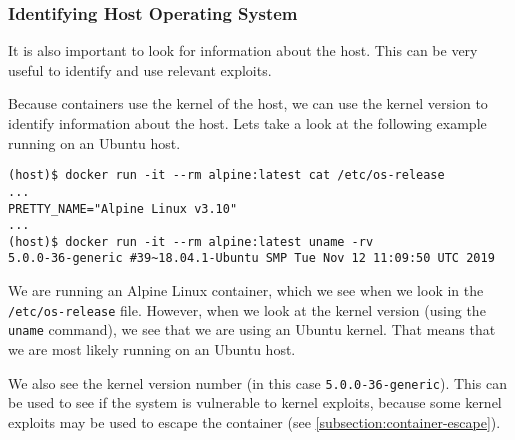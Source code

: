 \subsubsection{Identifying Host Operating System}
It is also important to look for information about the host. This can be very useful to identify and use relevant exploits.

\hfill

Because containers use the kernel of the host, we can use the kernel version to identify information about the host. Lets take a look at the following example running on an Ubuntu host.
\begin{lstlisting}[caption={\lstinline{/etc/os-release} and \lstinline{uname} differ},captionpos=b]
(host)$ docker run -it --rm alpine:latest cat /etc/os-release
...
PRETTY_NAME="Alpine Linux v3.10"
...
(host)$ docker run -it --rm alpine:latest uname -rv
5.0.0-36-generic #39~18.04.1-Ubuntu SMP Tue Nov 12 11:09:50 UTC 2019
\end{lstlisting}

We are running an Alpine Linux container, which we see when we look in the \lstinline{/etc/os-release} file. However, when we look at the kernel version (using the \lstinline{uname} command), we see that we are using an Ubuntu kernel. That means that we are most likely running on an Ubuntu host.

\hfill

We also see the kernel version number (in this case \lstinline{5.0.0-36-generic}). This can be used to see if the system is vulnerable to kernel exploits, because some kernel exploits may be used to escape the container (see \autoref{subsection:container-escape}).
